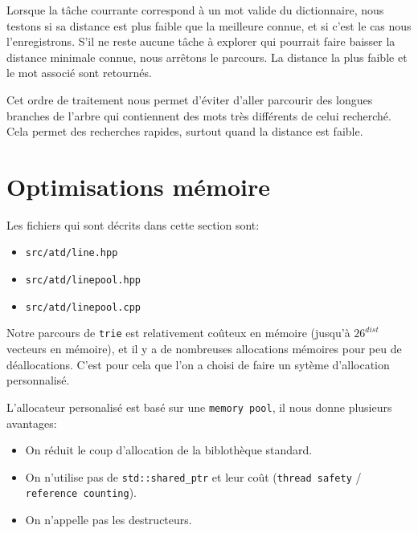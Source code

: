 \documentclass{article}
\begin{document}
Lorsque la tâche courrante correspond à un mot valide du dictionnaire,
nous testons si sa distance est plus faible que la meilleure connue, et
si c'est le cas nous l'enregistrons. S'il ne reste aucune tâche à explorer
qui pourrait faire baisser la distance minimale connue, nous arrêtons le parcours.
La distance la plus faible et le mot associé sont retournés.

Cet ordre de traitement nous permet d'éviter d'aller parcourir des longues
branches de l'arbre qui contiennent des mots très différents de celui recherché.
Cela permet des recherches rapides, surtout quand la distance est faible.

\section{Optimisations mémoire}
Les fichiers qui sont décrits dans cette section sont:
\begin{itemize}
	\item \texttt{src/atd/line.hpp}
	\item \texttt{src/atd/linepool.hpp}
	\item \texttt{src/atd/linepool.cpp}
\end{itemize}

Notre parcours de \texttt{trie} est relativement coûteux en mémoire
(jusqu'à $26^{dist}$ vecteurs en mémoire), et il y a de nombreuses allocations
mémoires pour peu de déallocations. C'est pour cela que l'on a choisi de faire
un sytème d'allocation personnalisé.

L'allocateur personalisé est basé sur une \texttt{memory pool},
il nous donne plusieurs avantages:
\begin{itemize}
  \item On réduit le coup d'allocation de la biblothèque standard.
  \item On n'utilise pas de \texttt{std::shared\_ptr} et leur coût
	  (\texttt{thread safety} / \texttt{reference counting}).
  \item On n'appelle pas les destructeurs.
\end{itemize}
\end{document}
